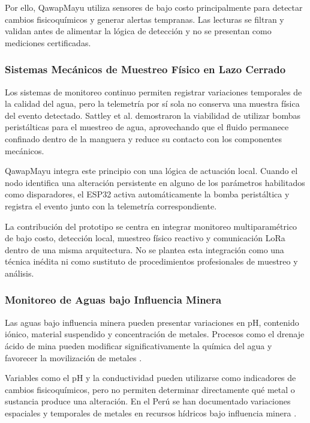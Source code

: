 \documentclass[11pt,a4paper]{article}
\begin{document}
Por ello, QawapMayu utiliza sensores de bajo costo principalmente para detectar cambios fisicoquímicos y generar alertas tempranas. Las lecturas se filtran y validan antes de alimentar la lógica de detección y no se presentan como mediciones certificadas.

\subsubsection{Sistemas Mecánicos de Muestreo Físico en Lazo Cerrado}

Los sistemas de monitoreo continuo permiten registrar variaciones temporales de la calidad del agua, pero la telemetría por sí sola no conserva una muestra física del evento detectado. Sattley et al. \cite{sattley} demostraron la viabilidad de utilizar bombas peristálticas para el muestreo de agua, aprovechando que el fluido permanece confinado dentro de la manguera y reduce su contacto con los componentes mecánicos.

QawapMayu integra este principio con una lógica de actuación local. Cuando el nodo identifica una alteración persistente en alguno de los parámetros habilitados como disparadores, el ESP32 activa automáticamente la bomba peristáltica y registra el evento junto con la telemetría correspondiente.

La contribución del prototipo se centra en integrar monitoreo multiparamétrico de bajo costo, detección local, muestreo físico reactivo y comunicación LoRa dentro de una misma arquitectura. No se plantea esta integración como una técnica inédita ni como sustituto de procedimientos profesionales de muestreo y análisis.

\subsubsection{Monitoreo de Aguas bajo Influencia Minera}

Las aguas bajo influencia minera pueden presentar variaciones en pH, contenido iónico, material suspendido y concentración de metales. Procesos como el drenaje ácido de mina pueden modificar significativamente la química del agua y favorecer la movilización de metales \cite{usgsMineDrainage}.

Variables como el pH y la conductividad pueden utilizarse como indicadores de cambios fisicoquímicos, pero no permiten determinar directamente qué metal o sustancia produce una alteración. En el Perú se han documentado variaciones espaciales y temporales de metales en recursos hídricos bajo influencia minera \cite{moreno2024,ocona2024}.
\end{document}
